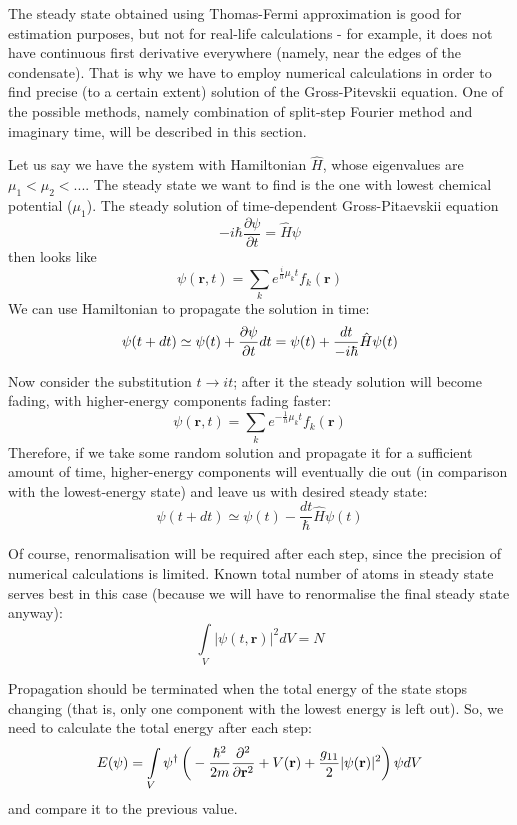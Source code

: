 \documentclass[12pt,notitlepage]{report}
\author{Bogdan Opanchuk}
\begin{document}
The steady state obtained using Thomas-Fermi approximation is good for estimation purposes, but not for
real-life calculations - for example, it does not have continuous first derivative everywhere (namely,
near the edges of the condensate). That is why we have to employ numerical calculations in order
to find precise (to a certain extent) solution of the Gross-Pitevskii equation. One of the possible methods, 
namely combination of split-step Fourier method and imaginary time, will be described in this section.

Let us say we have the system with Hamiltonian $\hat{H}$, whose eigenvalues are $\mu_1 < \mu_2 < ...$.
The steady state we want to find is the one with lowest chemical potential ($\mu_1$). The steady
solution of time-dependent Gross-Pitaevskii equation
\[ -i \hbar \frac{\partial \psi}{\partial t} = \hat{H} \psi \]
then looks like
\[ \psi(\mathbf{r}, t) = \sum_k e^{\frac{i}{h} \mu_k t} f_k(\mathbf{r}) \]
We can use Hamiltonian to propagate the solution in time:
\[ 
\psi(t + dt) \simeq \psi(t) + \frac{\partial \psi}{\partial t} dt = \\
\psi(t) + \frac{dt}{-i \hbar} \hat{H} \psi(t)
\]

Now consider the substitution $t \rightarrow it$; after it the steady solution will become fading, with
higher-energy components fading faster:
\[ \psi(\mathbf{r}, t) = \sum_k e^{- \frac{1}{h} \mu_k t} f_k(\mathbf{r}) \]
Therefore, if we take some random solution and propagate it for a sufficient amount of time, higher-energy
components will eventually die out (in comparison with the lowest-energy state) and leave us with desired 
steady state:
\[ \psi(t + dt) \simeq \psi(t) - \frac{dt}{\hbar} \hat{H} \psi(t)\]

Of course, renormalisation will be required after each step, since the precision of numerical calculations is limited.
Known total number of atoms in steady state serves best in this case (because we will have to renormalise the
final steady state anyway):
\[ \int\limits_V \vert \psi(t, \mathbf{r}) \vert^2 dV = N \]

Propagation should be terminated when the total energy of the state stops changing (that is, only one component
with the lowest energy is left out). So, we need to calculate the total energy after each step:
\[ E(\psi) = \int\limits_V \psi^\dagger \left( \\
-\frac{\hbar^2}{2m} \frac{\partial^2}{\partial \mathbf{r}^2} + V(\mathbf{r}) + \\
\frac{g_{11}}{2} \vert \psi(\mathbf{r}) \vert^2 \right) \psi dV \]
and compare it to the previous value.
\end{document}
